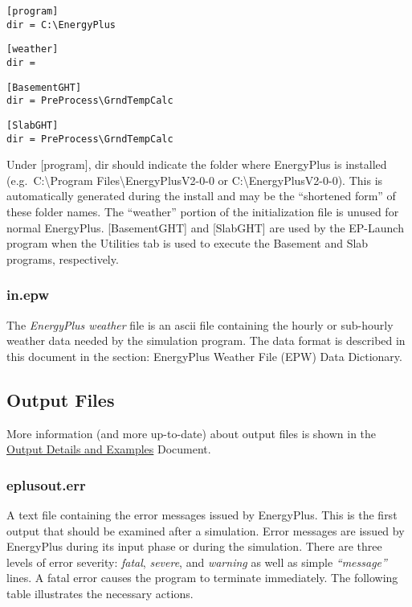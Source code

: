 \begin{lstlisting}
[program]
dir = C:\EnergyPlus
\end{lstlisting}

\begin{lstlisting}
[weather]
dir =
\end{lstlisting}

\begin{lstlisting}
[BasementGHT]
dir = PreProcess\GrndTempCalc
\end{lstlisting}

\begin{lstlisting}
[SlabGHT]
dir = PreProcess\GrndTempCalc
\end{lstlisting}

Under {[}program{]}, dir should indicate the folder where EnergyPlus is installed (e.g.~C:\textbackslash{}Program Files\textbackslash{}EnergyPlusV2-0-0 or C:\textbackslash{}EnergyPlusV2-0-0). This is automatically generated during the install and may be the ``shortened form'' of these folder names. The ``weather'' portion of the initialization file is unused for normal EnergyPlus. {[}BasementGHT{]} and {[}SlabGHT{]} are used by the EP-Launch program when the Utilities tab is used to execute the Basement and Slab programs, respectively.

\subsubsection{in.epw}\label{in.epw}

The \emph{EnergyPlus weather} file is an ascii file containing the hourly or sub-hourly weather data needed by the simulation program. The data format is described in this document in the section: EnergyPlus Weather File (EPW) Data Dictionary.

\subsection{Output Files}\label{output-files-000}

More information (and more up-to-date) about output files is shown in the \href{file:///E:/Docs4PDFs/OutputDetailsAndExamples.pdf}{Output Details and Examples} Document.

\subsubsection{eplusout.err}\label{eplusout.err}

A text file containing the error messages issued by EnergyPlus. This is the first output that should be examined after a simulation. Error messages are issued by EnergyPlus during its input phase or during the simulation. There are three levels of error severity: \emph{fatal}, \emph{severe}, and \emph{warning} as well as simple \emph{``message''} lines. A fatal error causes the program to terminate immediately. The following table illustrates the necessary actions.


